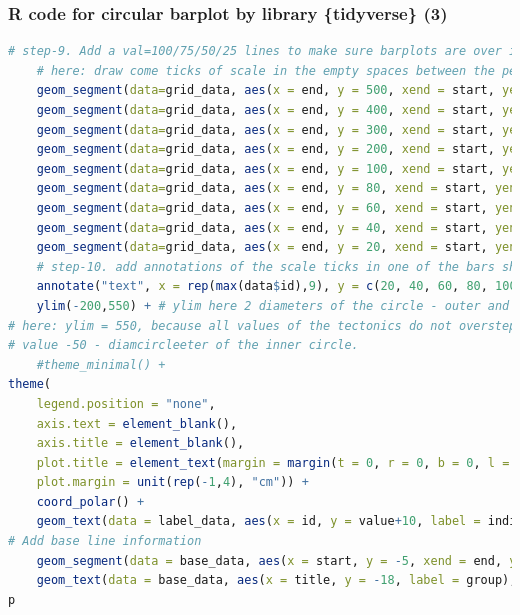 \documentclass[pdflatex,compress,10pt,
	xcolor={dvipsnames,dvipsnames,svgnames,x11names,table},
	hyperref={colorlinks = true,breaklinks = true, urlcolor = NavyBlue, breaklinks = true}]{beamer}
\begin{document}
\begin{frame}[fragile,shrink=20]\frametitle{R code for circular barplot by library \{tidyverse\} (3)}
\begin{lstlisting}[language=R]
	# step-9. Add a val=100/75/50/25 lines to make sure barplots are over it.
	# here: draw come ticks of scale in the empty spaces between the petals from 25 to 100, further up to 500 by 100.
	geom_segment(data=grid_data, aes(x = end, y = 500, xend = start, yend = 500), colour = "grey", alpha=1, size=0.3 , inherit.aes = FALSE ) + 
	geom_segment(data=grid_data, aes(x = end, y = 400, xend = start, yend = 400), colour = "grey", alpha=1, size=0.3 , inherit.aes = FALSE ) +
	geom_segment(data=grid_data, aes(x = end, y = 300, xend = start, yend = 300), colour = "grey", alpha=1, size=0.3 , inherit.aes = FALSE ) +
	geom_segment(data=grid_data, aes(x = end, y = 200, xend = start, yend = 200), colour = "grey", alpha=1, size=0.3 , inherit.aes = FALSE ) +
	geom_segment(data=grid_data, aes(x = end, y = 100, xend = start, yend = 100), colour = "grey", alpha=1, size=0.3 , inherit.aes = FALSE ) +
	geom_segment(data=grid_data, aes(x = end, y = 80, xend = start, yend = 80), colour = "grey", alpha=1, size=0.3 , inherit.aes = FALSE ) +
	geom_segment(data=grid_data, aes(x = end, y = 60, xend = start, yend = 60), colour = "grey", alpha=1, size=0.3 , inherit.aes = FALSE ) +
	geom_segment(data=grid_data, aes(x = end, y = 40, xend = start, yend = 40), colour = "grey", alpha=1, size=0.3 , inherit.aes = FALSE ) +
	geom_segment(data=grid_data, aes(x = end, y = 20, xend = start, yend = 20), colour = "grey", alpha=1, size=0.3 , inherit.aes = FALSE ) +
	# step-10. add annotations of the scale ticks in one of the bars showing the value of each 100/75/50/25 lines
	annotate("text", x = rep(max(data$id),9), y = c(20, 40, 60, 80, 100, 200, 300, 400, 500), label = c("20", "40", "60", "80", "100", "200", "300", "400", "500") , color="grey", size = 2 , angle=0, fontface="bold", hjust=1) +	
	ylim(-200,550) + # ylim here 2 diameters of the circle - outer and inner
# here: ylim = 550, because all values of the tectonics do not overstep 550 (i.e. outer circle) 
# value -50 - diamcircleeter of the inner circle.
	#theme_minimal() +  
theme(
	legend.position = "none",
	axis.text = element_blank(),
	axis.title = element_blank(),
	plot.title = element_text(margin = margin(t = 0, r = 0, b = 0, l = 0), size = 10, face = "bold"),
	plot.margin = unit(rep(-1,4), "cm")) +
	coord_polar() + 
	geom_text(data = label_data, aes(x = id, y = value+10, label = individual, hjust=hjust), color="black", fontface="bold",alpha=0.6, size=2.0, angle= label_data$angle, inherit.aes = FALSE ) +
# Add base line information
	geom_segment(data = base_data, aes(x = start, y = -5, xend = end, yend = -5), colour = "black", alpha=0.8, size=0.6 , inherit.aes = FALSE )  +
	geom_text(data = base_data, aes(x = title, y = -18, label = group), hjust=c(1,1,0,0), colour = "black", alpha=0.8, size=3, fontface="bold", inherit.aes = FALSE)
p
\end{lstlisting}
\end{frame}
\end{document}
